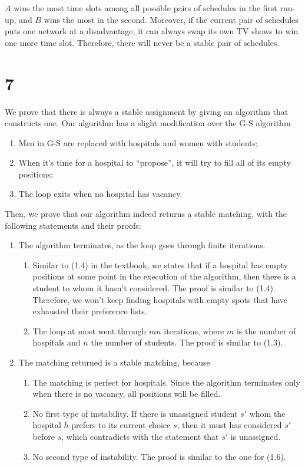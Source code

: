 \documentclass{article}
\begin{document}
$A$ wins the most time slots among all possible pairs of schedules in the first run-up, and $B$ wins the most in the second. Moreover, if the current pair of schedules puts one network at a disadvantage, it can always swap its own TV shows to win one more time slot. Therefore, there will never be a stable pair of schedules.

\section*{7}

We prove that there is always a stable assignment by giving an algorithm that constructs one. Our algorithm has a slight modification over the G-S algorithm

\begin{enumerate}
    \item Men in G-S are replaced with hospitals and women with students;
    \item When it's time for a hospital to ``propose'', it will try to fill all of its empty positions;
    \item The loop exits when no hospital has vacancy.
\end{enumerate}


Then, we prove that our algorithm indeed returns a stable matching, with the following statements and their proofs:

\begin{enumerate}
    \item The algorithm terminates, as the loop goes through finite iterations.
    \begin{enumerate}
        \item Similar to (1.4) in the textbook, we states that if a hospital has empty positions at some point in the execution of the algorithm, then there is a student to whom it hasn't considered. The proof is similar to (1.4). Therefore, we won't keep finding hospitals with empty spots that have exhausted their preference lists.
        \item The loop at most went through $mn$ iterations, where $m$ is the number of hospitals and $n$ the number of students. The proof is similar to (1.3).
    \end{enumerate}
    \item The matching returned is a stable matching, because
    \begin{enumerate}
        \item The matching is perfect for hospitals. Since the algorithm terminates only when there is no vacancy, all positions will be filled.
        \item No first type of instability. If there is unassigned student $s'$ whom the hospital $h$ prefers to its current choice $s$, then it must has considered $s'$ before $s$, which contradicts with the statement that $s'$ is unassigned.
        \item No second type of instability. The proof is similar to the one for (1.6).
    \end{enumerate}
\end{enumerate}
\end{document}
